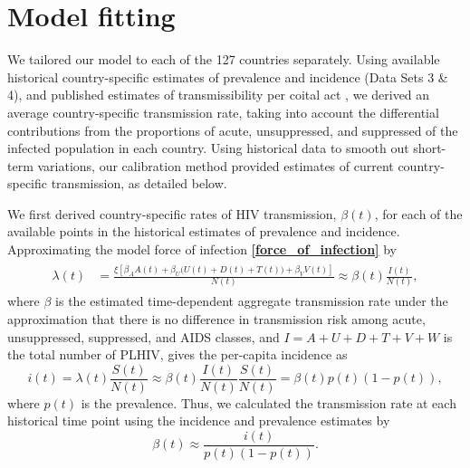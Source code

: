 \documentclass{article}
\renewcommand{\eqref}[1]{\textbf{\ref{#1}}}
\begin{document}
\section{Model fitting}
\label{model_fitting}

We tailored our model to each of the 127 countries separately.  Using
available historical country-specific estimates of prevalence and
incidence (Data Sets 3 \& 4), and published estimates of
transmissibility per coital
act \cite{Wawer2005-us, Donnell2010-xo, Hughes2012-so,
  Skarbinski2015-ni},
we derived an average country-specific transmission rate, taking into
account the differential contributions from the proportions of acute,
unsuppressed, and suppressed of the infected population in each
country.  Using historical data to smooth out short-term variations,
our calibration method provided estimates of current country-specific
transmission, as detailed below.

We first derived country-specific rates of HIV transmission,
$\beta(t)$, for each of the available points in the historical
estimates of prevalence and incidence.  Approximating the model
force of infection \eqref{force_of_infection} by
\begin{align}
  \label{foi}
  \begin{split}
    \lambda(t) &= \frac{\xi \left[\beta_{A} A(t)
        + \beta_{U} \big(U(t) + D(t) + T(t)\big) +
        \beta_{V} V(t)\right]}{N(t)}
    \approx  \beta(t) \frac{I(t)}{N(t)},
  \end{split}
\end{align}
where $\beta$ is the estimated time-dependent aggregate transmission
rate under the approximation that there is no difference in
transmission risk among acute, unsuppressed, suppressed, and AIDS
classes, and $I = A + U + D + T + V + W$ is the total number of PLHIV,
gives the per-capita incidence as
\begin{equation}
i(t) = \lambda(t) \frac{S(t)}{N(t)}
\approx \beta(t) \frac{I(t)}{N(t)} \frac{S(t)}{N(t)} =\beta(t) p(t) (1-p(t)),
\end{equation}
where $p(t)$ is the prevalence. Thus, we calculated the transmission
rate at each historical time point using the incidence and prevalence
estimates by
\begin{equation}
  \label{trans_rate}
  \beta(t) \approx \frac{i(t)}{p(t)(1-p(t))}.
\end{equation}
\end{document}

